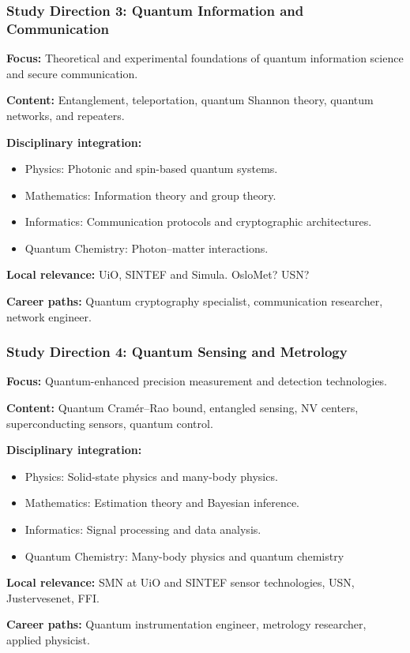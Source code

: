 \documentclass{beamer}
\begin{document}
\begin{frame}
\frametitle{Study Direction 3: Quantum Information and Communication}
\textbf{Focus:} Theoretical and experimental foundations of quantum information science and secure communication.

\textbf{Content:} Entanglement, teleportation, quantum Shannon theory, quantum networks, and repeaters.

\textbf{Disciplinary integration:}
\begin{itemize}
    \item Physics: Photonic and spin-based quantum systems.
    \item Mathematics: Information theory and group theory.
    \item Informatics: Communication protocols and cryptographic architectures.
    \item Quantum Chemistry: Photon–matter interactions.
\end{itemize}

\textbf{Local relevance:} UiO, SINTEF and  Simula. OsloMet? USN?

\textbf{Career paths:} Quantum cryptography specialist, communication researcher, network engineer.

\end{frame}


\begin{frame}
\frametitle{Study Direction 4: Quantum Sensing and Metrology}
\textbf{Focus:} Quantum-enhanced precision measurement and detection technologies.

\textbf{Content:} Quantum Cramér–Rao bound, entangled sensing, NV centers, superconducting sensors, quantum control.

\textbf{Disciplinary integration:}
\begin{itemize}
    \item Physics: Solid-state physics and many-body physics.
    \item Mathematics: Estimation theory and  Bayesian inference.
    \item Informatics: Signal processing  and data analysis.
    \item Quantum Chemistry: Many-body physics and quantum chemistry
\end{itemize}

\textbf{Local relevance:} SMN  at UiO and SINTEF sensor technologies, USN, Justervesenet, FFI.

\textbf{Career paths:} Quantum instrumentation engineer, metrology researcher, applied physicist.

\end{frame}
\end{document}

